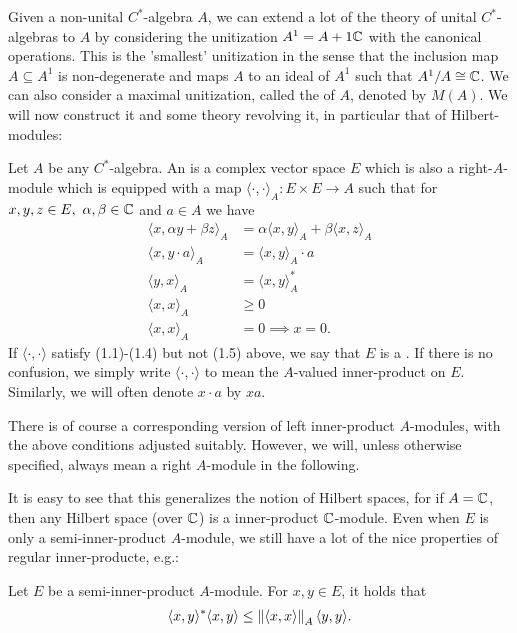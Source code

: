 Given a non-unital $C^*$-algebra $A$, we can extend a lot of the theory of unital $C^*$-algebras to $A$ by considering the unitization $A^1 = A + 1\mathbb{C}$ with the canonical operations. This is the 'smallest' unitization in the sense that the inclusion map $A \subseteq A^1$ is non-degenerate and maps $A$ to an ideal of $A^1$ such that $A^1/A \cong \mathbb{C}$. We can also consider a maximal unitization, called the  of $A$, denoted by $M(A)$. We will now construct it and some theory revolving it, in particular that of Hilbert-modules:
\begin{definition}
	Let $A$ be any $C^*$-algebra. An  is a complex vector space $E$ which is also a right-$A$-module which is equipped with a map $\langle \cdot, \cdot\rangle_A \colon E \times E \to A$ such that for $x,y,z \in E, \ \alpha,\beta \in \mathbb{C}$ and $a \in A$ we have
	\begin{align}
		\langle x , \alpha y + \beta z \rangle_A &= \alpha \langle x,y\rangle_A+\beta \langle x,z \rangle_A\\
		\langle x , y \cdot a \rangle_{A} &= \langle x,y\rangle_A \cdot a\\
		\langle y,x \rangle_A &= \langle x,y\rangle_A^*\\
		\langle x,x \rangle_A &\geq 0\\
		\langle x,x \rangle_A &= 0 \implies x = 0. 
	\end{align}
	If $\langle \cdot , \cdot \rangle$ satisfy (1.1)-(1.4) but not (1.5) above, we say that $E$ is a . If there is no confusion, we simply write $\langle \cdot, \cdot \rangle$ to mean the $A$-valued inner-product on $E$. Similarly, we will often denote $x \cdot a$ by $xa$. 

	There is of course a corresponding version of left inner-product $A$-modules, with the above conditions adjusted suitably. However, we will, unless otherwise specified, always mean a right $A$-module in the following.
	\label{mult:defmod}
\end{definition}
It is easy to see that this generalizes the notion of Hilbert spaces, for if $A= \mathbb{C}$, then any Hilbert space (over $\mathbb{C}$) is a inner-product $\mathbb{C}$-module. Even when $E$ is only a semi-inner-product $A$-module, we still have a lot of the nice properties of regular inner-producte, e.g.:
\begin{proposition}
Let $E$ be a semi-inner-product $A$-module. For $x,y \in E$, it holds that
\begin{align*}
	\langle x,y\rangle^* \langle x,y \rangle \leq \left\lVert \langle x , x \rangle \right\rVert_A \langle y , y \rangle.
\end{align*}
\end{proposition}
